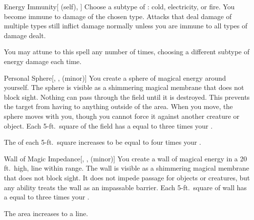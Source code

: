 \lowercase{\hypertarget{spell:Energy Immunity}{}}\label{spell:Energy Immunity}
\begin{attuneability}[Rank 5]{\hypertarget{spell:Energy Immunity}{Energy Immunity}}[ (self), ]
Choose a subtype of : cold, electricity, or fire.
You become immune to damage of the chosen type.
Attacks that deal damage of multiple types still inflict damage normally unless you are immune to all types of damage dealt.

\rankline
{} You may attune to this spell any number of times, choosing a different subtype of energy damage each time.

\end{attuneability}
\vspace{0.25em}



\lowercase{\hypertarget{spell:Personal Sphere}{}}\label{spell:Personal Sphere}
\begin{freeability}[Rank 5]{\hypertarget{spell:Personal Sphere}{Personal Sphere}}[, ,  (minor)]
You create a sphere of magical energy around yourself.
The sphere is visible as a shimmering magical membrane that does not block sight.
Nothing can pass through the field until it is destroyed.
This prevents the target from having  to anything outside of the area.
When you move, the sphere moves with you, though you cannot force it against another creature or object.
Each 5-ft.\ square of the field has a  equal to three times your .

\rankline
{} The  of each 5-ft.\ square increases to be equal to four times your .

\end{freeability}
\vspace{0.25em}



\lowercase{\hypertarget{spell:Wall of Magic Impedance}{}}\label{spell:Wall of Magic Impedance}
\begin{freeability}[Rank 5]{\hypertarget{spell:Wall of Magic Impedance}{Wall of Magic Impedance}}[, ,  (minor)]
\targetrule
You create a wall of magical energy in a 20 ft.\ high, \areamed line within \rngmed range.
The wall is visible as a shimmering magical membrane that does not block sight.
It does not impede passage for objects or creatures, but any  ability treats the wall as an impassable barrier.
Each 5-ft.\ square of wall has a  equal to three times your .

\rankline
{} The area increases to a \arealarge line.

\end{freeability}
\vspace{0.25em}



